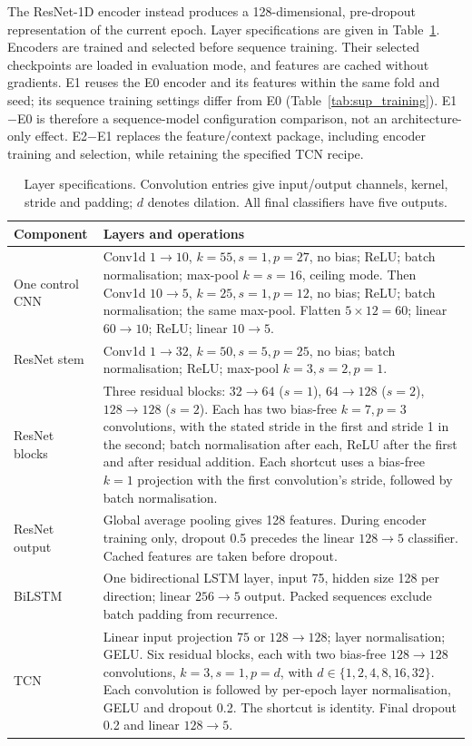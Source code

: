 \documentclass[10pt,a4paper]{article}
\begin{document}
The ResNet-1D encoder instead produces a 128-dimensional, pre-dropout representation of the current
epoch. Layer specifications are given in Table~\ref{tab:sup_architecture}. Encoders are trained and
selected before sequence training. Their selected checkpoints are loaded in evaluation mode, and
features are cached without gradients. E1 reuses the E0 encoder and its features within the same
fold and seed; its sequence training settings differ from E0 (Table~\ref{tab:sup_training}). E1$-$E0
is therefore a sequence-model configuration comparison, not an architecture-only effect. E2$-$E1
replaces the feature/context package, including encoder training and selection, while retaining the
specified TCN recipe.

\begin{table}[H]
\centering\small
\caption{Layer specifications. Convolution entries give input/output channels, kernel, stride and
padding; $d$ denotes dilation. All final classifiers have five outputs.}
\label{tab:sup_architecture}
\begin{tabularx}{\textwidth}{p{2.5cm}X}
\toprule
Component & Layers and operations \\
\midrule
One control CNN & Conv1d $1\!\to\!10$, $k=55,s=1,p=27$, no bias; ReLU; batch
normalisation; max-pool $k=s=16$, ceiling mode. Then Conv1d $10\!\to\!5$,
$k=25,s=1,p=12$, no bias; ReLU; batch normalisation; the same max-pool.
Flatten $5\times12=60$; linear $60\!\to\!10$; ReLU; linear $10\!\to\!5$. \\
ResNet stem & Conv1d $1\!\to\!32$, $k=50,s=5,p=25$, no bias; batch normalisation;
ReLU; max-pool $k=3,s=2,p=1$. \\
ResNet blocks & Three residual blocks: $32\!\to\!64$ ($s=1$), $64\!\to\!128$
($s=2$), $128\!\to\!128$ ($s=2$). Each has two bias-free $k=7,p=3$ convolutions,
with the stated stride in the first and stride 1 in the second; batch normalisation after each,
ReLU after the first and after residual addition. Each shortcut uses a bias-free $k=1$ projection
with the first convolution's stride, followed by batch normalisation. \\
ResNet output & Global average pooling gives 128 features. During encoder training only,
dropout 0.5 precedes the linear $128\!\to\!5$ classifier. Cached features are taken before dropout. \\
BiLSTM & One bidirectional LSTM layer, input 75, hidden size 128 per direction;
linear $256\!\to\!5$ output. Packed sequences exclude batch padding from recurrence. \\
TCN & Linear input projection $75$ or $128\!\to\!128$; layer normalisation; GELU.
Six residual blocks, each with two bias-free $128\!\to\!128$ convolutions,
$k=3,s=1,p=d$, with $d\in\{1,2,4,8,16,32\}$. Each convolution is followed by
per-epoch layer normalisation, GELU and dropout 0.2. The shortcut is identity.
Final dropout 0.2 and linear $128\!\to\!5$. \\
\bottomrule
\end{tabularx}
\end{table}
\end{document}
